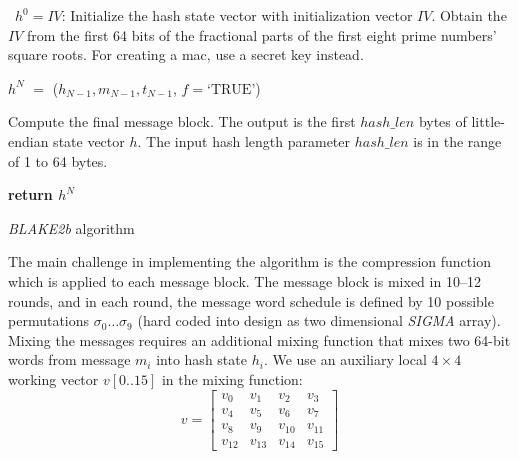 \documentclass[%
	a4paper,
]
{article}
\newcommand{\done}[1]{}
\begin{document}
\begin{algorithm}
\justifying

	\ $h^{0}=IV$: Initialize the hash state vector with initialization
		vector $IV$. Obtain the $IV$ from the first 64 bits of the fractional
		parts of the first eight prime numbers' square roots. For creating
		a \gls{mac}, use a secret key instead.

	\BlankLine
	

	\BlankLine
	

	$h^{N}$ $=$ ($h_{N-1}, m_{N-1},t_{N-1}$, $f=\textrm{`TRUE'} $) \

		Compute the final message block. The output is the first $hash\_len$
		bytes of little-endian state vector $h$. The input hash length parameter
		$hash\_len$ is in the range of 1 to 64 bytes.
		\done{This sentence is not quite clear to me... Is the information
		regarding $hash\_len$ relevant here?}

	\BlankLine

	\textbf{return $h^{N}$}
	
	\caption{\emph{BLAKE2b} algorithm}
	\label{alg:bbs}
	
\end{algorithm}

The main challenge in implementing the algorithm is the compression function
which is applied to each message block.
%
The message block is mixed in 10--12 rounds, and in each round, the message word
schedule is defined by 10 possible permutations $\sigma_0\dots\sigma_9$ (hard
coded into design as two dimensional \emph{SIGMA} array).
%
Mixing the messages requires an additional mixing function that mixes two
64-bit words from message $m_i$ into hash state $h_i$. We use an auxiliary
local $4\times{}4$ working vector $v[0..15]$ in the  mixing function:
\[
   v=
  \left[ {\begin{array}{cccc}
   v_0 & v_1 &v_2 & v_3 \\
   v_4 & v_5 &v_6 & v_7\\
   v_8 & v_9 &v_{10} & v_{11}\\
   v_{12} & v_{13} &v_{14} & v_{15}
  \end{array} } \right]
\]
	    
\end{document}
